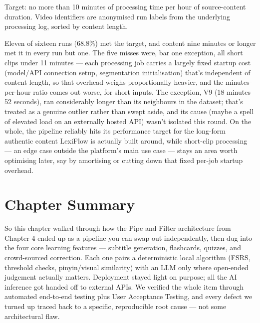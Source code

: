 \begin{table}[H]
\begin{tabular}{lcccc}
        \bottomrule
    \end{tabular}
    \begin{flushleft}
        \small Target: no more than 10 minutes of processing time per hour of source-content duration. Video identifiers are anonymised run labels from the underlying processing log, sorted by content length.
    \end{flushleft}
\end{table} Eleven of sixteen runs (68.8\%) met the target, and content nine minutes or longer met it in every run but one. The five misses were, bar one exception, all short clips under 11 minutes --- each processing job carries a largely fixed startup cost (model/API connection setup, segmentation initialisation) that's independent of content length, so that overhead weighs proportionally heavier, and the minutes-per-hour ratio comes out worse, for short inputs. The exception, V9 (18 minutes 52 seconds), ran considerably longer than its neighbours in the dataset; that's treated as a genuine outlier rather than swept aside, and its cause (maybe a spell of elevated load on an externally hosted API) wasn't isolated this round. On the whole, the pipeline reliably hits its performance target for the long-form authentic content LexiFlow is actually built around, while short-clip processing --- an edge case outside the platform's main use case --- stays an area worth optimising later, say by amortising or cutting down that fixed per-job startup overhead.
\section{Chapter Summary}So this chapter walked through how the Pipe and Filter architecture from Chapter 4 ended up as a pipeline you can swap out independently, then dug into the four core learning features --- subtitle generation, flashcards, quizzes, and crowd-sourced correction. Each one pairs a deterministic local algorithm (FSRS, threshold checks, pinyin/visual similarity) with an LLM only where open-ended judgement actually matters. Deployment stayed light on purpose; all the AI inference got handed off to external APIs. We verified the whole item through automated end-to-end testing plus User Acceptance Testing, and every defect we turned up traced back to a specific, reproducible root cause --- not some architectural flaw.
